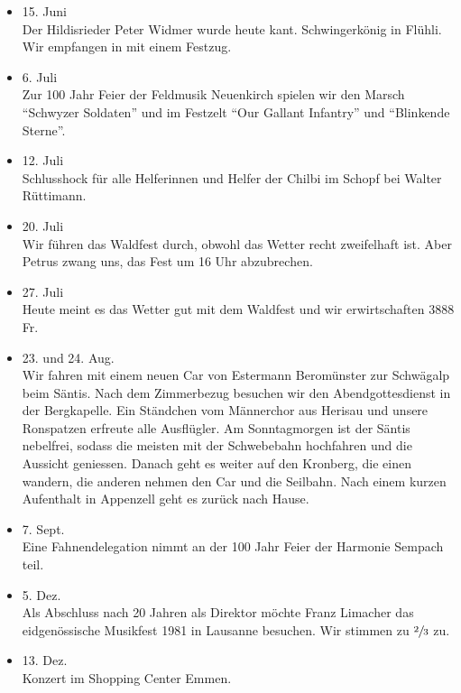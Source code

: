 \begin{multicols}{2}
\begin{itemize}
        \item[]15. Juni\\
        Der Hildisrieder Peter Widmer wurde heute kant. Schwingerkönig in
        Flühli. Wir empfangen in mit einem Festzug.

        \item[]6. Juli\\
        Zur 100 Jahr Feier der Feldmusik Neuenkirch spielen wir den Marsch
        "`Schwyzer Soldaten"' und im Festzelt "`Our Gallant Infantry"' und
        "`Blinkende Sterne"'.

        \item[]12. Juli\\
        Schlusshock für alle Helferinnen und Helfer der Chilbi im Schopf bei
        Walter Rüttimann.

        \item[]20. Juli\\
        Wir führen das Waldfest durch, obwohl das Wetter recht zweifelhaft ist.
        Aber Petrus zwang uns, das Fest um 16 Uhr abzubrechen.

        \item[]27. Juli\\
        Heute meint es das Wetter gut mit dem Waldfest und wir erwirtschaften
        3888 Fr.

        \item[]23. und 24. Aug.\\
        Wir fahren mit einem neuen Car von Estermann Beromünster zur Schwägalp
        beim Säntis. Nach dem Zimmerbezug besuchen wir den Abendgottesdienst in
        der Bergkapelle. Ein Ständchen vom Männerchor aus Herisau und unsere
        Ronspatzen erfreute alle Ausflügler. Am Sonntagmorgen ist der Säntis
        nebelfrei, sodass die meisten mit der Schwebebahn hochfahren und die
        Aussicht geniessen. Danach geht es weiter auf den Kronberg, die einen
        wandern, die anderen nehmen den Car und die Seilbahn. Nach einem kurzen
        Aufenthalt in Appenzell geht es zurück nach Hause.

        \item[]7. Sept.\\
        Eine Fahnendelegation nimmt an der 100 Jahr Feier der Harmonie Sempach
        teil.

        \item[]5. Dez.\\
        Als Abschluss nach 20 Jahren als Direktor möchte Franz Limacher das
        eidgenössische Musikfest 1981 in Lausanne besuchen. Wir stimmen zu
        $\sfrac{2}{3}$ zu.

        \item[]13. Dez.\\
        Konzert im Shopping Center Emmen.


    \end{itemize}

\end{multicols}
